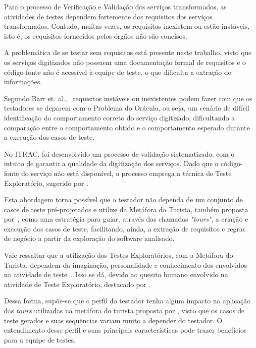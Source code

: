 Para o processo de Verificação e Validação dos serviços transformados, as atividades de testes dependem fortemente dos requisitos dos serviços transformados. Contudo, muitas vezes, os requisitos inexistem ou estão instáveis, isto é, os requisitos fornecidos pelos órgãos não são concisos.

A problemática de se testar sem requisitos está presente neste trabalho, visto que os serviços digitizados não possuem uma documentação formal de requisitos e o código-fonte não é acessível à equipe de teste, o que dificulta a extração de informações.

Segundo Barr et. al.,~\cite{barr2015oracle} requisitos instáveis ou inexistentes podem fazer com que os testadores se deparem com o Problema do Oráculo, ou seja, um cenário de difícil identificação do comportamento correto do serviço digitizado, dificultando a comparação entre o comportamento obtido e o comportamento esperado durante a execução dos casos de teste.

No ITRAC, foi desenvolvido um processo de validação sistematizado, com o intuito de garantir a qualidade da digitização dos serviços.  Dado que o código-fonte do serviço não está disponível, o processo emprega a técnica de Teste Exploratório, sugerido por \cite{whittaker2009exploratory}. 

Esta abordagem torna possível que o testador não dependa de um conjunto de casos de teste pré-projetados e utilize da Metáfora do Turista, também proposta por~\cite{whittaker2009exploratory}, como uma estratégia para guiar, através das chamadas \textit{"tours"}, a criação e execução dos casos de teste, facilitando, ainda, a extração de requisitos e regras de negócio a partir da exploração do software analisado.

Vale ressaltar que a utilização dos Testes Exploratórios, com a Metáfora do Turista, dependem da imaginação,  personalidade e conhecimento dos envolvidos na atividade de teste~\cite{itkonen2012role}. Isso se dá, devido ao quesito humano envolvido na atividade de Teste Exploratório, destacado por \cite{whittaker2009exploratory}.

Dessa forma, supõe-se que o perfil do testador tenha algum impacto na aplicação das \textit{tours} utilizadas na metáfora do turista proposta por \cite{whittaker2009exploratory}, visto que os casos de teste gerados e suas sequências variam muito a depender do testador. O entendimento desse perfil e suas principais características pode trazer benefícios para a equipe de testes.

